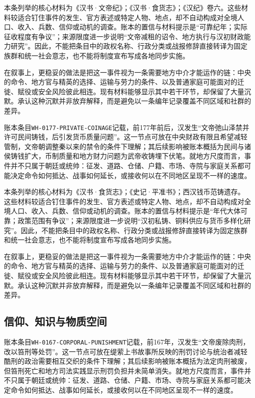 本条列举的核心材料为《汉书·文帝纪》；《汉书·食货志》；《汉纪》卷六。这些材料较适合钉住事件的发生、官方表述或特定人物、地点，却不自动构成对全境人口、收入、兵数、信仰或动机的调查。账本的置信与材料提示是“可靠纪年；实际征收程度有争议”；来源限度进一步说明“文帝减租的诏令、地方执行与汉初财政能力研究”。因此，不能把条目中的政权名称、行政分类或战报修辞直接转译为固定族群和统一社会意志，也不能将制度宣布写成各地同步实施。

在叙事上，更稳妥的做法是把这一事件视为一条需要地方中介才能运作的链：中央的命令、地方官与精英的选择、运输与劳力的条件、以及普通家庭可能面对的迁徙、赋役或安全风险彼此相连。现有材料能够显示其中若干环节，却保留了大量沉默。承认这种沉默并非放弃解释，而是避免以一条编年记录覆盖不同区域和社群的差异。

账本条目\texttt{WH-0177-PRIVATE-COINAGE}记载，前177年前后，汉发生“文帝弛山泽禁并许可民间铸钱，后引发货币质量问题”。这一节点可放在中央财政有限且希望减轻管制，文帝朝调整秦以来的禁令的条件下理解；其后续影响被账本概括为民间与诸侯铸钱扩大，币制质量和地方财力问题为武帝收铸埋下伏笔。就地方尺度而言，事件并不只属于朝廷或统帅：征发、道路、仓储、户籍、市场、寺院与家庭关系都可能决定命令如何抵达、战事如何延长，或接收何以在不同地区呈现不一样的速度。

本条列举的核心材料为《汉书·食货志》；《史记·平准书》；西汉钱币范铸遗存。这些材料较适合钉住事件的发生、官方表述或特定人物、地点，却不自动构成对全境人口、收入、兵数、信仰或动机的调查。账本的置信与材料提示是“年代大体可靠；政策范围有争议”；来源限度进一步说明“汉初私铸、铜料供应与货币多样化研究”。因此，不能把条目中的政权名称、行政分类或战报修辞直接转译为固定族群和统一社会意志，也不能将制度宣布写成各地同步实施。

在叙事上，更稳妥的做法是把这一事件视为一条需要地方中介才能运作的链：中央的命令、地方官与精英的选择、运输与劳力的条件、以及普通家庭可能面对的迁徙、赋役或安全风险彼此相连。现有材料能够显示其中若干环节，却保留了大量沉默。承认这种沉默并非放弃解释，而是避免以一条编年记录覆盖不同区域和社群的差异。

\subsection{信仰、知识与物质空间}

账本条目\texttt{WH-0167-CORPORAL-PUNISHMENT}记载，前167年，汉发生“文帝废除肉刑，改以笞刑等处罚”。这一节点可放在缇萦上书故事所反映的刑罚讨论与统治者减轻酷刑的政治需要相互交织的条件下理解；其后续影响被账本概括为法定肉刑被废，但笞刑死亡和地方司法实践显示刑罚负担并未简单消失。就地方尺度而言，事件并不只属于朝廷或统帅：征发、道路、仓储、户籍、市场、寺院与家庭关系都可能决定命令如何抵达、战事如何延长，或接收何以在不同地区呈现不一样的速度。

